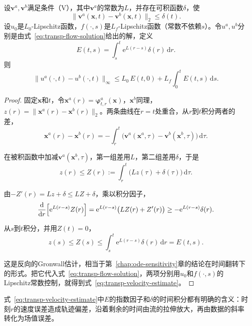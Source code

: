 \begin{theorem}
\label{thm:transp-velocity}
设$\bm{v}^{a},\bm{v}^{b}$满足条件（V），其中$\bm{v}^{a}$的常数为$L$，并存在可积函数$\delta$，使
\begin{equation}
  \lVert\bm{v}^{a}(\bm{x},t)-\bm{v}^{b}(\bm{x},t)\rVert_2\leq\delta(t).
  \label{eq:transp-velocity-gap}
\end{equation}
设$u_0$是$L_0$-Lipschitz函数，$f(\cdot,s)$是$L_f$-Lipschitz函数（常数不依赖$s$）。令$u^{a},u^{b}$分别是由式~\eqref{eq:transp-flow-solution}给出的解，定义
\begin{equation}
  E(t,s)=\int_s^{t}\mathrm{e}^{L(r-s)}\delta(r)\,\mathrm{d}r.
  \label{eq:transp-velocity-integral}
\end{equation}
则
\begin{equation}
  \lVert u^{a}(\cdot,t)-u^{b}(\cdot,t)\rVert_{\infty}
  \leq L_0\,E(t,0)+L_f\int_0^{t}E(t,s)\,\mathrm{d}s.
  \label{eq:transp-velocity-estimate}
\end{equation}
\end{theorem}

\begin{proof}
固定$\bm{x}$和$t$，令$\bm{x}^{a}(r)=\bm{\varphi}^{a}_{t,r}(\bm{x})$，$\bm{x}^{b}$同理，$z(r)=\lVert\bm{x}^{a}(r)-\bm{x}^{b}(r)\rVert_2$。两条曲线在$r=t$处重合，从$r$到$t$积分两者的差，
\[
  \bm{x}^{a}(r)-\bm{x}^{b}(r)
  =-\int_r^{t}\bigl(\bm{v}^{a}(\bm{x}^{a},\tau)-\bm{v}^{b}(\bm{x}^{b},\tau)\bigr)\,\mathrm{d}\tau.
\]

在被积函数中加减$\bm{v}^{a}(\bm{x}^{b},\tau)$，第一组差用$L$，第二组差用$\delta$，于是
\[
  z(r)\leq Z(r):=\int_r^{t}\bigl(Lz(\tau)+\delta(\tau)\bigr)\,\mathrm{d}\tau.
\]

由$-Z'(r)=Lz+\delta\leq LZ+\delta$，乘以积分因子，
\[
  \frac{\mathrm{d}}{\mathrm{d}r}\Bigl[\mathrm{e}^{L(r-s)}Z(r)\Bigr]
  =\mathrm{e}^{L(r-s)}\bigl(LZ(r)+Z'(r)\bigr)\geq-\mathrm{e}^{L(r-s)}\delta(r).
\]

从$s$到$t$积分，并用$Z(t)=0$，
\[
  z(s)\leq Z(s)\leq\int_s^{t}\mathrm{e}^{L(r-s)}\delta(r)\,\mathrm{d}r=E(t,s).
\]

这是反向的Gronwall估计，相当于第~\ref{chap:ode-sensitivity}章的结论在时间翻转下的形式。把它代入式~\eqref{eq:transp-flow-solution}，两项分别用$u_0$和$f(\cdot,s)$的Lipschitz常数控制，就得到式~\eqref{eq:transp-velocity-estimate}。
\end{proof}

式~\eqref{eq:transp-velocity-estimate}中$E$的指数因子和$\delta$的时间积分都有明确的含义：时刻$r$的速度误差造成轨迹偏差，沿着剩余的时间由流的拉伸放大，再由数据的斜率转化为场值误差。

